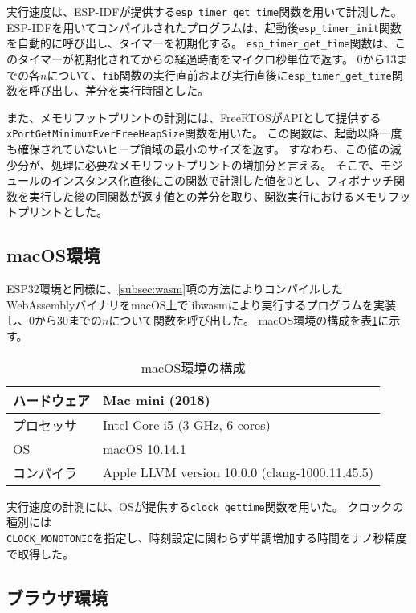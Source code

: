 実行速度は、ESP-IDFが提供する\verb|esp_timer_get_time|関数を用いて計測した。
ESP-IDFを用いてコンパイルされたプログラムは、起動後\verb|esp_timer_init|関数を自動的に呼び出し、タイマーを初期化する。
\verb|esp_timer_get_time|関数は、このタイマーが初期化されてからの経過時間をマイクロ秒単位で返す。
0から13までの各$n$について、\verb|fib|関数の実行直前および実行直後に\verb|esp_timer_get_time|関数を呼び出し、差分を実行時間とした。

また、メモリフットプリントの計測には、FreeRTOSがAPIとして提供する \\
\verb|xPortGetMinimumEverFreeHeapSize|関数を用いた。
この関数は、起動以降一度も確保されていないヒープ領域の最小のサイズを返す。
すなわち、この値の減少分が、処理に必要なメモリフットプリントの増加分と言える。
そこで、モジュールのインスタンス化直後にこの関数で計測した値を0とし、フィボナッチ関数を実行した後の同関数が返す値との差分を取り、関数実行におけるメモリフットプリントとした。

\subsection{macOS環境}

ESP32環境と同様に、\ref{subsec:wasm}項の方法によりコンパイルしたWebAssemblyバイナリをmacOS上でlibwasmにより実行するプログラムを実装し、0から30までの$n$について関数を呼び出した。
macOS環境の構成を表\ref{tab:mac_spec}に示す。

\begin{table}[htbp]
  \label{tab:mac_spec}
  \caption{macOS環境の構成}
  \begin{center}
    \begin{tabular}{|l|l|}
    \hline
    ハードウェア & Mac mini (2018) \\ \hline
    プロセッサ & Intel Core i5 (3 GHz, 6 cores) \\ \hline
    OS & macOS 10.14.1 \\ \hline
    コンパイラ & Apple LLVM version 10.0.0 (clang-1000.11.45.5) \\ \hline
    \end{tabular}
  \end{center}
\end{table}

実行速度の計測には、OSが提供する\verb|clock_gettime|関数を用いた。
クロックの種別には \\
\verb|CLOCK_MONOTONIC|を指定し、時刻設定に関わらず単調増加する時間をナノ秒精度で取得した。

\subsection{ブラウザ環境}

